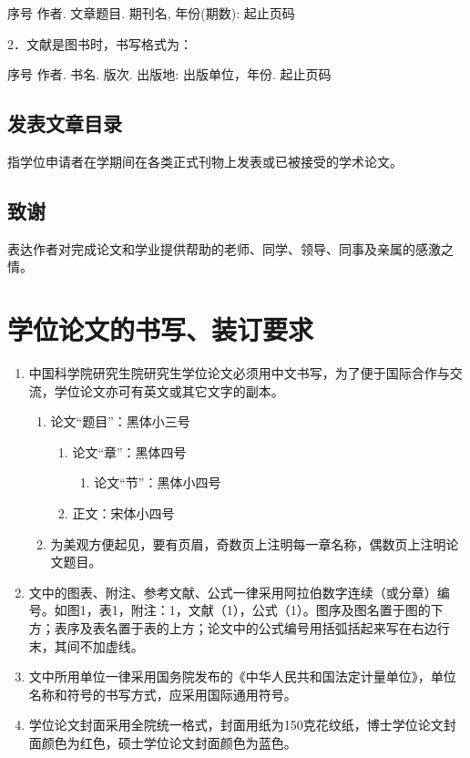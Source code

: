 \documentclass[a4paper,12pt,oneside,openany]{book}
\begin{document}
序号 作者. 文章题目. 期刊名, 年份(期数): 起止页码

2．文献是图书时，书写格式为：

序号 作者. 书名. 版次. 出版地: 出版单位，年份. 起止页码


\subsection{发表文章目录}

指学位申请者在学期间在各类正式刊物上发表或已被接受的学术论文。


\subsection{致谢}

表达作者对完成论文和学业提供帮助的老师、同学、领导、同事及亲属的感激之情。


\section{学位论文的书写、装订要求}
\begin{enumerate}
\item 中国科学院研究生院研究生学位论文必须用中文书写，为了便于国际合作与交流，学位论文亦可有英文或其它文字的副本。

\begin{enumerate}
\item 论文“题目”：黑体小三号

\begin{enumerate}
\item 论文“章”：黑体四号

\begin{enumerate}
\item 论文“节”：黑体小四号
\end{enumerate}
\item 正文：宋体小四号
\end{enumerate}
\item 为美观方便起见，要有页眉，奇数页上注明每一章名称，偶数页上注明论文题目。
\end{enumerate}
\item 文中的图表、附注、参考文献、公式一律采用阿拉伯数字连续（或分章）编号。如图1，表1，附注：1，文献（1），公式（1）。图序及图名置于图的下方；表序及表名置于表的上方；论文中的公式编号用括弧括起来写在右边行末，其间不加虚线。
\item 文中所用单位一律采用国务院发布的《中华人民共和国法定计量单位》，单位名称和符号的书写方式，应采用国际通用符号。
\item 学位论文封面采用全院统一格式，封面用纸为150克花纹纸，博士学位论文封面颜色为红色，硕士学位论文封面颜色为蓝色。 
\end{enumerate}
\printindex{}
\end{document}
